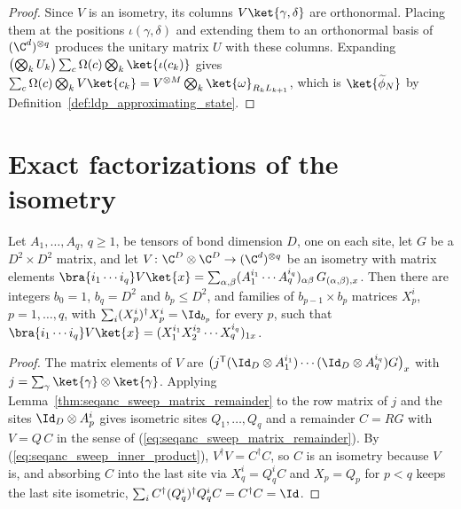 \begin{proof}
    \leanok
    Since $V$ is an isometry, its columns $V\ket{\gamma,\delta}$ are
    orthonormal. Placing them at the positions $\iota(\gamma,\delta)$ and
    extending them to an orthonormal basis of $(\C^d)^{\otimes q}$ produces the
    unitary matrix $U$ with these columns. Expanding
    $\bigl(\bigotimes_kU_k\bigr)\sum_c\Omega(c)\bigotimes_k\ket{\iota(c_k)}$
    gives $\sum_c\Omega(c)\bigotimes_kV\ket{c_k}
        =V^{\otimes M}\bigotimes_k\ket{\omega}_{R_kL_{k+1}}$, which is
    $\ket{\widetilde\phi_N}$ by Definition~\ref{def:ldp_approximating_state}.
\end{proof}

\section{Exact factorizations of the isometry}

\begin{lemma}
    \label{thm:ldp_sequential_factorization_general}
    \leanok
    Let $A_1,\dots,A_q$, $q\ge1$, be tensors of bond dimension $D$, one on each
    site, let $G$ be a $D^2\times D^2$ matrix, and let
    $V\colon\C^D\otimes\C^D\to(\C^d)^{\otimes q}$ be an isometry with matrix
    elements
    $\bra{i_1\cdots i_q}V\ket{x}
        =\sum_{\alpha,\beta}(A_1^{i_1}\cdots A_q^{i_q})_{\alpha\beta}\,
        G_{(\alpha,\beta),x}$.
    Then there are integers $b_0=1$, $b_q=D^2$ and $b_p\le D^2$, and families
    of $b_{p-1}\times b_p$ matrices $X_p^i$, $p=1,\dots,q$, with
    $\sum_i(X_p^i)^\dagger X_p^i=\Id_{b_p}$ for every $p$, such that
    $\bra{i_1\cdots i_q}V\ket{x}=(X_1^{i_1}X_2^{i_2}\cdots X_q^{i_q})_{1x}$.
\end{lemma}
\begin{proof}
    \leanok
    The matrix elements of $V$ are
    $\bigl(j^{\mathsf T}(\Id_D\otimes A_1^{i_1})\cdots(\Id_D\otimes A_q^{i_q})G\bigr)_x$
    with $j=\sum_\gamma\ket{\gamma}\otimes\ket{\gamma}$. Applying
    Lemma~\ref{thm:seqanc_sweep_matrix_remainder} to the row matrix of $j$ and the
    sites $\Id_D\otimes A_p^i$ gives isometric sites $Q_1,\dots,Q_q$ and a
    remainder $C=RG$ with $V=Q\,C$ in the sense of
    (\ref{eq:seqanc_sweep_matrix_remainder}). By
    (\ref{eq:seqanc_sweep_inner_product}), $V^\dagger V=C^\dagger C$, so $C$ is an
    isometry because $V$ is, and absorbing $C$ into the last site via $X_q^i=Q_q^iC$ and
    $X_p=Q_p$ for $p<q$ keeps the last site isometric,
    $\sum_i C^\dagger(Q_q^i)^\dagger Q_q^iC=C^\dagger C=\Id$.
\end{proof}


